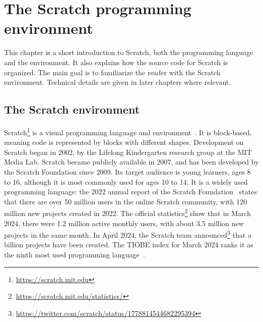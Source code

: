 \documentclass[../main]{subfiles}
\begin{document}
\chapter{The Scratch programming environment}\label{ch:scratch-the-programming-environment}


This chapter is a short introduction to Scratch, both the programming language and the environment.
It also explains how the source code for Scratch is organized.
The main goal is to familiarize the reader with the Scratch environment.
Technical details are given in later chapters where relevant.

\section{The Scratch environment}\label{sec:scratch-environment}

Scratch\footnote{\url{https://scratch.mit.edu}} is a visual programming language and environment~\autocite{resnickScratchProgrammingAll2009}.
It is block-based, meaning code is represented by blocks with different shapes.
Development on Scratch began in 2002, by the Lifelong Kindergarten research group at the MIT Media Lab.
Scratch became publicly available in 2007, and has been developed by the Scratch Foundation since 2009.
Its target audience is young learners, ages 8 to 16, although it is most commonly used for ages 10 to 14.
It is a widely used programming language: the 2022 annual report of the Scratch Foundation~\autocite{scratchfoundationGrowingGlobalCreative2022} states that there are over 50 million users in the online Scratch community, with 120 million new projects created in 2022.
The official statistics\footnote{\url{https://scratch.mit.edu/statistics/}} show that in March 2024, there were 1.2 million active monthly users, with about 3.5 million new projects in the same month.
In April 2024, the Scratch team announced\footnote{\url{https://twitter.com/scratch/status/1778814544682295394}} that a billion projects have been created.
The TIOBE index for March 2024 ranks it as the ninth most used programming language~\autocite{tiobeTIOBEIndexMarch2024}.
\end{document}

